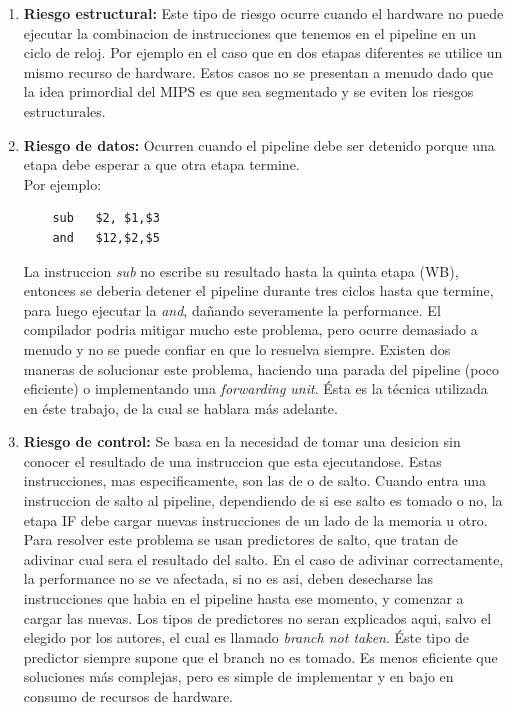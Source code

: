 \documentclass[12pt]{article}
\begin{document}
\begin{enumerate}
    \item \textbf{Riesgo estructural:} Este tipo de riesgo ocurre cuando el hardware no puede ejecutar la combinacion de instrucciones que tenemos en el pipeline en un ciclo de reloj. Por ejemplo en el caso que en dos etapas diferentes se utilice un mismo recurso de hardware. Estos casos no se presentan a menudo dado que la idea primordial del MIPS es que sea segmentado y se eviten los riesgos estructurales.
    \item \textbf{Riesgo de datos:} Ocurren cuando el pipeline debe ser detenido porque una etapa debe esperar a que otra etapa termine. \\

    Por ejemplo:
    \begin{lstlisting}
    sub   $2, $1,$3
    and   $12,$2,$5
    \end{lstlisting}

    La instruccion \textit{sub} no escribe su resultado hasta la quinta etapa (WB), entonces se deberia detener el pipeline durante tres ciclos hasta que termine, para luego ejecutar la \textit{and}, dañando severamente la performance. El compilador podria mitigar mucho este problema, pero ocurre demasiado a menudo y no se puede confiar en que lo resuelva siempre. Existen dos maneras de solucionar este problema, haciendo una parada del pipeline (poco eficiente) o implementando una \textit{forwarding unit}. Ésta es la técnica utilizada en éste trabajo, de la cual se hablara más adelante.
    \item \textbf{Riesgo de control:} Se basa en la necesidad de tomar una desicion sin conocer el resultado de una instruccion que esta ejecutandose. Estas instrucciones, mas especificamente, son las de  o de salto. Cuando entra una instruccion de salto al pipeline, dependiendo de si ese salto es tomado o no, la etapa IF debe cargar nuevas instrucciones de un lado de la memoria u otro. Para resolver este problema se usan predictores de salto, que tratan de adivinar cual sera el resultado del salto. En el caso de adivinar correctamente, la performance no se ve afectada, si no es asi, deben desecharse las instrucciones que habia en el pipeline hasta ese momento, y comenzar a cargar las nuevas. Los tipos de predictores no seran explicados aqui, salvo el elegido por los autores, el cual es llamado \textit{branch not taken}. Éste tipo de predictor siempre supone que el branch no es tomado. Es menos eficiente que soluciones más complejas, pero es simple de implementar y en bajo en consumo de recursos de hardware.
\end{enumerate}
\end{document}
